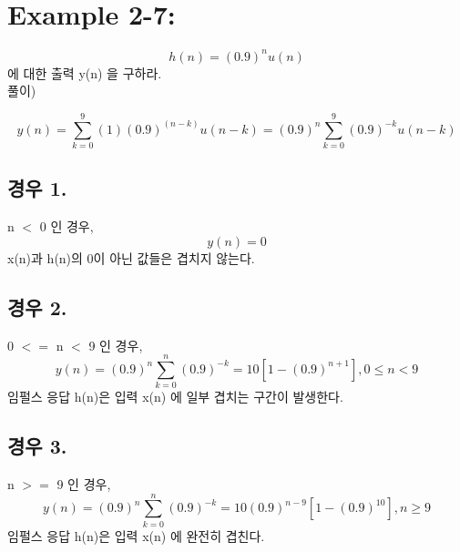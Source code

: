 \documentclass[11pt
  , a4paper
  , article
  , oneside
]{memoir}
\begin{document}

\chapter{Example 2-7:}

\begin {equation}
h(n) = (0.9)^n u(n) 
\end {equation}
에 대한 출력 y(n) 을 구하라.\\
풀이)

\begin {equation}
y(n) = \displaystyle\sum_{k=0}^{9} (1)(0.9)^{(n-k)}u(n-k)=(0.9)^n\displaystyle\sum_{k=0}^{9}(0.9)^{-k}u(n-k)
\end {equation}

\section{경우 1.}
n $<$ 0 인 경우, \\
\begin {equation}
y(n) = 0
\end {equation}
x(n)과 h(n)의 0이 아닌 값들은 겹치지 않는다.

\section{경우 2.}
0 $<= $ n $<$ 9 인 경우, \\
\begin {equation}
y(n) = (0.9)^n\displaystyle\sum_{k=0}^{n}(0.9)^{-k}=10[1-(0.9)^{n+1}],  0 \leq n < 9
\end {equation}
임펄스 응답 h(n)은 입력 x(n) 에 일부 겹치는 구간이 발생한다.

\section{경우 3.}
n $>= $ 9 인 경우, \\
\begin {equation}
y(n) = (0.9)^n\displaystyle\sum_{k=0}^{n}(0.9)^{-k}=10(0.9)^{n-9}[1-(0.9)^{10}],  n \geq 9
\end {equation}
임펄스 응답 h(n)은 입력 x(n) 에 완전히 겹친다.
\end{document}
